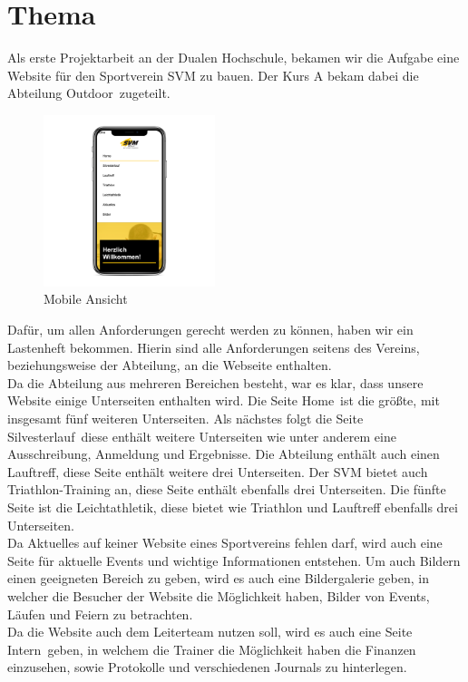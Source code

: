 \documentclass[12pt,a4paper]{article}
\begin{document}
\section{Thema}
Als erste Projektarbeit an der Dualen Hochschule, bekamen wir die Aufgabe eine Website für den Sportverein SVM zu bauen. Der Kurs A bekam dabei die Abteilung \dq Outdoor\dq \ zugeteilt. 
\begin{figure}
  \includegraphics[width=5cm]{iphone.png}
  \caption{Mobile Ansicht}
\end{figure}
Dafür, um allen Anforderungen gerecht werden zu können, haben wir ein Lastenheft bekommen. 
Hierin sind alle Anforderungen seitens des Vereins, beziehungsweise der Abteilung, an die Webseite enthalten.\\
Da die Abteilung aus mehreren Bereichen besteht, war es klar, dass unsere Website einige Unterseiten enthalten wird. Die Seite \dq Home\dq \ ist die größte, mit insgesamt fünf weiteren Unterseiten. Als nächstes folgt die Seite \dq Silvesterlauf\dq \ diese enthält weitere Unterseiten wie unter anderem eine Ausschreibung, Anmeldung und Ergebnisse. Die Abteilung enthält auch einen Lauftreff, diese Seite enthält weitere drei Unterseiten. Der SVM bietet auch Triathlon-Training an, diese Seite enthält ebenfalls drei Unterseiten. Die fünfte Seite ist die Leichtathletik, diese bietet wie Triathlon und Lauftreff ebenfalls drei Unterseiten.\\
Da Aktuelles auf keiner Website eines Sportvereins fehlen darf, wird auch eine Seite für aktuelle Events und wichtige Informationen entstehen. 
Um auch Bildern einen geeigneten Bereich zu geben, wird es auch eine Bildergalerie geben, in welcher die Besucher der Website die Möglichkeit haben, Bilder von Events, Läufen und Feiern zu betrachten. \\
Da die Website auch dem Leiterteam nutzen soll, wird es auch eine Seite \dq Intern\dq \ geben, in welchem die Trainer die Möglichkeit haben die Finanzen einzusehen, sowie Protokolle und verschiedenen Journals zu hinterlegen. 
\end{document}
